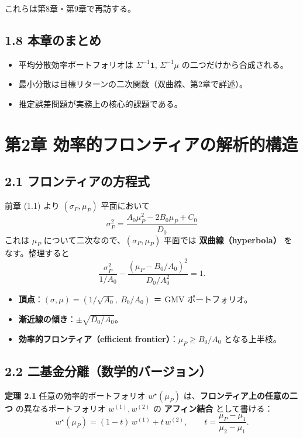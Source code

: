 \documentclass[11pt,a4paper]{report}
\begin{document}
これらは第8章・第9章で再訪する。

\section{1.8 本章のまとめ}

\begin{itemize}
\item 平均分散効率ポートフォリオは $\Sigma^{-1}\mathbf{1}$, $\Sigma^{-1}\mu$ の二つだけから合成される。
\item 最小分散は目標リターンの二次関数（双曲線、第2章で詳述）。
\item 推定誤差問題が実務上の核心的課題である。
\end{itemize}

\noindent\hrulefill

\chapter{第2章 効率的フロンティアの解析的構造}

\section{2.1 フロンティアの方程式}

前章 (1.1) より $(\sigma_P, \mu_P)$ 平面において \[ \sigma_P^2 = \frac{A_0 \mu_P^2 - 2 B_0 \mu_P + C_0}{D_0} \] これは $\mu_P$ について二次なので、$(\sigma_P, \mu_P)$ 平面では \textbf{双曲線（hyperbola）} をなす。整理すると \[ \frac{\sigma_P^2}{1/A_0} - \frac{(\mu_P - B_0/A_0)^2}{D_0/A_0^2} = 1. \tag{2.1} \]

\begin{itemize}
\item \textbf{頂点}：$(\sigma, \mu) = (1/\sqrt{A_0},\ B_0/A_0)$ ＝ GMV ポートフォリオ。
\item \textbf{漸近線の傾き}：$\pm \sqrt{D_0/A_0}$。
\item \textbf{効率的フロンティア（efficient frontier）}：$\mu_P \ge B_0/A_0$ となる上半枝。
\end{itemize}

\section{2.2 二基金分離（数学的バージョン）}

\textbf{定理 2.1} 任意の効率的ポートフォリオ $w^\star(\mu_P)$ は、\textbf{フロンティア上の任意の二つ} の異なるポートフォリオ $w^{(1)}, w^{(2)}$ の \textbf{アフィン結合} として書ける： \[ w^\star(\mu_P) = (1-t)\, w^{(1)} + t\, w^{(2)},\qquad t = \frac{\mu_P - \mu_1}{\mu_2 - \mu_1}. \]
\end{document}
